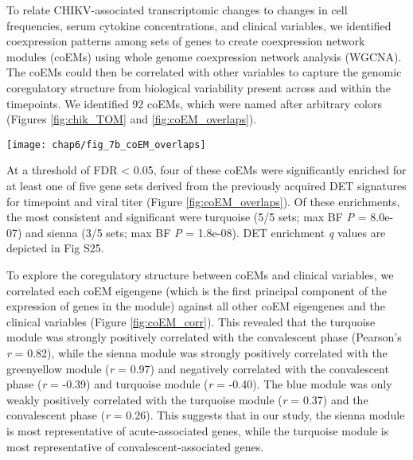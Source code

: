 To relate CHIKV-associated transcriptomic changes to changes in cell \subcommunity{} frequencies, serum cytokine concentrations, and clinical variables, we identified coexpression patterns among sets of genes to create coexpression network modules (coEMs) using whole genome coexpression network analysis (WGCNA).\autocite{Zhang2005} The coEMs could then be correlated with other variables to capture the genomic coregulatory structure from biological variability present across and within the timepoints. We identified 92 coEMs, which were named after arbitrary colors (Figures \ref{fig:chik_TOM} and \ref{fig:coEM_overlaps}). 
\begin{figure*}
  \centering
  \texttt{[image: chap6/fig\_7b\_coEM\_overlaps]}
  \caption[Enrichment of five subsets of the DET signatures in the coexpression modules]{
  \textbf{Enrichment of five subsets of the DET signatures for CHIKV infection phase and viral titer} (see Figures \ref{fig:DET_timepoint_volcano} and \ref{fig:DET_viral_volcano}) among each of the 92 coEMs (X axis), showing the fractional overlap of the module with the DET signature (Y axis). *\emph{q} < 0.05, ***\emph{q} < 0.001; \emph{q} values are Benjamini-Hochberg adjusted \emph{P} values (Fig S25 shows \emph{q} values for all tests). The four coEMs highlighted in Figure \ref{fig:chik_TOM} have at least one significant DET signature enrichment.
  }
  \label{fig:coEM_overlaps}
\end{figure*}
At a threshold of FDR < 0.05, four of these coEMs were significantly enriched for at least one of five gene sets derived from the previously acquired DET signatures for timepoint and viral titer (Figure \ref{fig:coEM_overlaps}). Of these enrichments, the most consistent and significant were turquoise (5/5 sets; max BF \emph{P} = 8.0e-07) and sienna (3/5 sets; max BF \emph{P} = 1.8e-08). DET enrichment \emph{q} values are depicted in Fig S25.

To explore the coregulatory structure between coEMs and clinical variables, we correlated each coEM eigengene (which is the first principal component of the expression of genes in the module) against all other coEM eigengenes and the clinical variables (Figure \ref{fig:coEM_corr}). This revealed that the turquoise module was strongly positively correlated with the convalescent phase (Pearson’s \emph{r} = 0.82), while the sienna module was strongly positively correlated with the greenyellow module (\emph{r} = 0.97) and negatively correlated with the convalescent phase (\emph{r} = -0.39) and turquoise module (\emph{r} = -0.40). The blue module was only weakly positively correlated with the turquoise module (\emph{r} = 0.37) and the convalescent phase (\emph{r} = 0.26). This suggests that in our study, the sienna module is most representative of acute-associated genes, while the turquoise module is most representative of convalescent-associated genes.

